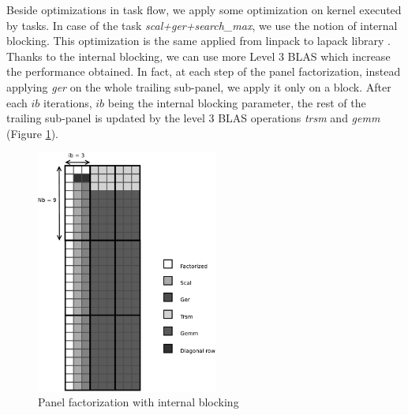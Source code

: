 Beside optimizations in task flow, we apply some optimization on kernel executed by tasks. In case of the task \textit{scal+ger+search\_max}, we use the notion of internal blocking. This optimization is the same applied from linpack to lapack library \cite{Anderson:1990:LPL}. Thanks to the internal blocking, we can use more Level 3 BLAS which increase the performance obtained. In fact, at each step of the panel factorization, instead applying \emph{ger} on the whole trailing sub-panel, we apply it only on a block. After each $ib$ iterations, $ib$ being the internal blocking parameter, the rest of the trailing sub-panel is updated by the level 3 BLAS operations \emph{trsm} and \emph{gemm} (Figure \ref{fig:panel_ib}).

\begin{figure}[!ht]
\centering
\includegraphics[height=8cm]{figures/panel_ib_bw.pdf}
\caption{Panel factorization with internal blocking\label{fig:panel_ib}}
\end{figure}
